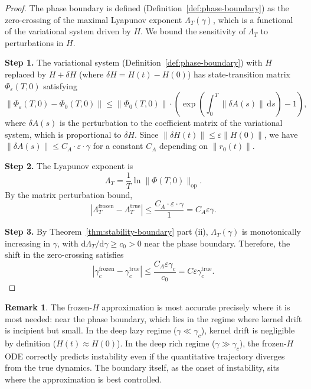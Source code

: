 \documentclass[11pt]{article}
\theoremstyle{definition}
\newtheorem{remark}[theorem]{Remark}
\newcommand{\norm}[1]{\lVert #1 \rVert}
\newcommand{\dd}{\mathrm{d}}
\begin{document}
\begin{proof}
The phase boundary is defined (Definition~\ref{def:phase-boundary}) as the zero-crossing of the maximal Lyapunov exponent $\Lambda_T(\gamma)$, which is a functional of the variational system driven by $H$. We bound the sensitivity of $\Lambda_T$ to perturbations in $H$.

\textbf{Step 1.} The variational system (Definition~\ref{def:phase-boundary}) with $H$ replaced by $H + \delta H$ (where $\delta H = H(t) - H(0)$) has state-transition matrix $\Phi_\varepsilon(T,0)$ satisfying
\begin{equation}
\norm{\Phi_\varepsilon(T,0) - \Phi_0(T,0)} \le \norm{\Phi_0(T,0)} \cdot \left(\exp\!\left(\int_0^T \norm{\delta A(s)}\,\dd s\right) - 1\right),
\end{equation}
where $\delta A(s)$ is the perturbation to the coefficient matrix of the variational system, which is proportional to $\delta H$. Since $\norm{\delta H(t)} \le \varepsilon \norm{H(0)}$, we have $\norm{\delta A(s)} \le C_A \cdot \varepsilon \cdot \gamma$ for a constant $C_A$ depending on $\norm{r_0(t)}$.

\textbf{Step 2.} The Lyapunov exponent is
\begin{equation}
\Lambda_T = \frac{1}{T}\ln \norm{\Phi(T,0)}_{\mathrm{op}}.
\end{equation}
By the matrix perturbation bound,
\begin{equation}
|\Lambda_T^{\mathrm{frozen}} - \Lambda_T^{\mathrm{true}}| \le \frac{C_A \cdot \varepsilon \cdot \gamma}{1} = C_A \varepsilon \gamma.
\end{equation}

\textbf{Step 3.} By Theorem~\ref{thm:stability-boundary} part (ii), $\Lambda_T(\gamma)$ is monotonically increasing in $\gamma$, with $\dd\Lambda_T/\dd\gamma \ge c_0 > 0$ near the phase boundary. Therefore, the shift in the zero-crossing satisfies
\begin{equation}
|\gamma_c^{\mathrm{frozen}} - \gamma_c^{\mathrm{true}}| \le \frac{C_A \varepsilon \gamma_c}{c_0} = C \varepsilon \gamma_c^{\mathrm{true}}.
\end{equation}
\end{proof}

\begin{remark}
The frozen-$H$ approximation is most accurate precisely where it is most needed: near the phase boundary, which lies in the regime where kernel drift is incipient but small. In the deep lazy regime ($\gamma \ll \gamma_c$), kernel drift is negligible by definition ($H(t) \approx H(0)$). In the deep rich regime ($\gamma \gg \gamma_c$), the frozen-$H$ ODE correctly predicts instability even if the quantitative trajectory diverges from the true dynamics. The boundary itself, as the onset of instability, sits where the approximation is best controlled.
\end{remark}
\end{document}
